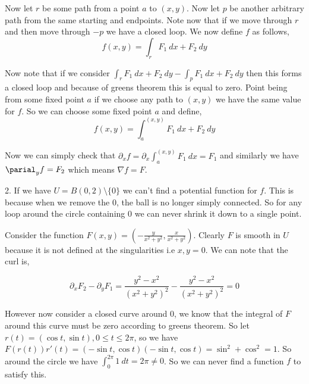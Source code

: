 \documentclass[a4paper]{article}
\begin{document}
\vspace{1em}

Now let $r$ be some path from a point $a$ to $(x,y)$. Now let $p$ be another arbitrary path from the same starting and endpoints. Note now that if we move through $r$ and then move through $-p$ we have a closed loop. We now define $f$ as follows,
\[
    f(x,y) = \int_{r} F_{1} \ dx + F_{2} \ dy
\]

Now note that if we consider $\int_{r}  F_{1} \ dx + F_{2} \ dy - \int_{p} F_{1} \ dx + F_{2} \ dy$ then this forms a closed loop and because of greens theorem this is equal to zero. Point being from some fixed point $a$ if we choose any path to $(x,y)$ we have the same value for $f$.  So we can choose some  fixed point $a$ and define, 
\[
    f(x,y) = \int_{a}^{(x,y)}  F_{1} \ dx + F_{2} \ dy
\]

Now we can simply check that $\partial_x f = \partial_x \int_{a}^{(x,y)} F_{1} \ dx = F_{1}$ and similarly we have $\parial_y f = F_{2}$ which means $\nabla f = F$.


\vspace{1em}

2. If we have $U = B(0, 2) \setminus \{0\}$ we can't find a potential function for $f$. This is because when we remove the 0, the ball is no longer simply connected. So for any loop around the circle containing $0$ we can never shrink it down to a single point.

\vspace{1em}

Consider the function $F(x,y) = \left ( -\frac{y}{x^2 + y^2}, \frac{x}{x^2 + y^2}\right )$. Clearly $F$ is smooth in $U$ because it is not defined at the singularities i.e $x,y = 0$. We can note that the curl is, 

\[
    \partial_x F_{2} - \partial_y F_{1} = \frac{y^2 - x^2}{(x^2 + y^2)^2} - \frac{y^2 - x^2}{(x^2 + y^2)^2} = 0
\]

However now consider a closed curve around $0$, we know that the integral of $F$ around this curve must be zero according to greens theorem. So let $r(t) = (\cos t, \sin t), 0 \le t \le 2 \pi$, so we have $F(r(t)) r'(t) = (-\sin t, \cos t)(-\sin t, \cos t) = \sin^2 + \cos^2 = 1$. So around the circle we have $\int_{0}^{2\pi}  1 \ dt = 2\pi \ne 0$. So we can never find a function $f$ to satisfy this.
\end{document}
